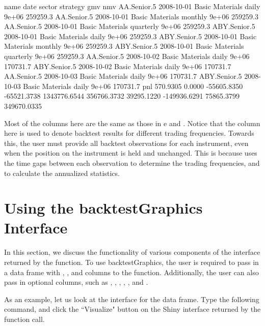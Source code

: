 \documentclass[article]{jss}
\begin{document}
\begin{Schunk}
\begin{Soutput}
         name       date          sector  strategy   gmv      nmv
  AA.Senior.5 2008-10-01 Basic Materials     daily 9e+06 259259.3
  AA.Senior.5 2008-10-01 Basic Materials   monthly 9e+06 259259.3
  AA.Senior.5 2008-10-01 Basic Materials quarterly 9e+06 259259.3
 ABY.Senior.5 2008-10-01 Basic Materials     daily 9e+06 259259.3
 ABY.Senior.5 2008-10-01 Basic Materials   monthly 9e+06 259259.3
 ABY.Senior.5 2008-10-01 Basic Materials quarterly 9e+06 259259.3
  AA.Senior.5 2008-10-02 Basic Materials     daily 9e+06 170731.7
 ABY.Senior.5 2008-10-02 Basic Materials     daily 9e+06 170731.7
  AA.Senior.5 2008-10-03 Basic Materials     daily 9e+06 170731.7
 ABY.Senior.5 2008-10-03 Basic Materials     daily 9e+06 170731.7
          pnl
     570.9305
       0.0000
  -55605.8350
  -65521.3738
 1343776.6544
  356766.3732
   39295.1220
 -149936.6291
   75865.3799
  349670.0335
\end{Soutput}
\end{Schunk}

\noindent
Most of the columns here are the same as those in e and . Notice that the  column here is used to denote backtest results for different trading frequencies. Towards this, the user must provide all backtest observations for each instrument, even when the position on the instrument is held and unchanged. This is because  uses the time gaps between each observation to determine the trading frequencies, and to calculate the annualized statistics. 



\section{Using the backtestGraphics Interface} \label{sec:backtestgraphics}

In this section, we discuss the functionality of various components of the  interface returned by the  function. To use backtestGraphics, the user is required to pass in a data frame with , ,  and  columns to the  function. Additionally, the user can also pass in optional columns, such as , , , , , and . 


\noindent
As an example, let us look at the interface for the  data frame. Type the following command, and click the ``Visualize" button on the Shiny interface returned by the function call.
\end{document}
